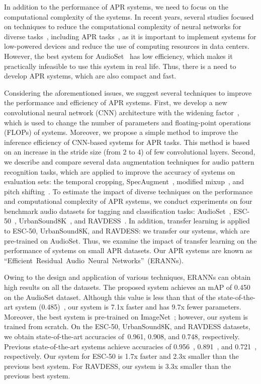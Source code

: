 \documentclass{article}
\begin{document}
\begin{sloppy}
In addition to the performance of APR systems, we need to focus on the computational complexity of the systems. In recent years, several studies focused on techniques to reduce the computational complexity of neural networks for diverse tasks~\cite{pmlr-v97-tan19a}, including APR tasks~\cite{9414229}, as it is important to implement systems for low-powered devices and reduce the use of computing resources in data centers. However, the best system for AudioSet~\cite{gong21b_interspeech} has low efficiency, which makes it practically infeasible to use this system in real life. Thus, there is a need to develop APR systems, which are also compact and fast.

Considering the aforementioned issues, we suggest several techniques to improve the performance and efficiency of APR systems. First, we develop a new convolutional neural network (CNN) architecture with the widening factor~\cite{zagoruyko2017wide}, which is used to change the number of parameters and floating-point operations (FLOPs) of systems. Moreover, we propose a simple method to improve the inference efficiency of CNN-based systems for APR tasks. This method is based on an increase in the stride size (from 2 to 4) of few convolutional layers. Second, we describe and compare several data augmentation techniques for audio pattern recognition tasks, which are applied to improve the accuracy of systems on evaluation sets: the temporal cropping, SpecAugment~\cite{Park2019SpecAugmentAS}, modified mixup~\cite{tokozume2018learning}, and pitch shifting~\cite{810857}. To estimate the impact of diverse techniques on the performance and computational complexity of APR systems, we conduct experiments on four benchmark audio datasets for tagging and classification tasks:  AudioSet~\cite{7952261}, \hbox{ESC-50~\cite{10.1145/2733373.2806390}}, \hbox{UrbanSound8K~\cite{10.1145/2647868.2655045}}, and RAVDESS~\cite{Livingstone2018TheRA}. In addition, transfer learning is applied to \mbox{ESC-50}, UrbanSound8K, and RAVDESS: we transfer our systems, which are pre-trained on AudioSet. Thus, we examine the impact of transfer learning on the performance of systems on small APR datasets. Our APR systems are known as \hbox{``Efficient Residual Audio Neural Networks'' (ERANNs)}.

Owing to the design and application of various techniques, ERANNs can obtain high results on all the datasets. The proposed system achieves an mAP of 0.450 on the AudioSet dataset. Although this value is less than that of the state-of-the-art system (0.485)~\cite{gong21b_interspeech}, our system is 7.1x faster and has 9.7x fewer parameters. Moreover, the best system is pre-trained on ImageNet~\cite{5206848}; however, our system is trained from scratch. On the ESC-50, UrbanSound8K, and RAVDESS datasets, we obtain state-of-the-art accuracies of~0.961, 0.908, and 0.748, respectively. Previous state-of-the-art systems achieve accuracies of 0.956~\cite{gong21b_interspeech}, 0.891~\cite{Guzhov2021ESResNeXtfbspLR}, and 0.721~\cite{9229505}, respectively. Our system for ESC-50 is 1.7x faster and 2.3x smaller than the previous best system. For RAVDESS, our system is 3.3x smaller than the previous best system.


\end{sloppy}
\end{document}
